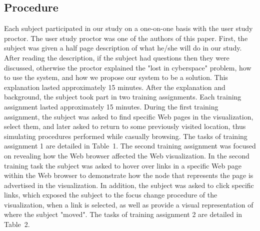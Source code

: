 \documentclass[]{article}
\begin{document}
{\begin{table}[t]
\label{table:assign2}
\end{table}

\subsection{Procedure}

Each subject participated in our study on a one-on-one basis with the user study proctor.  The user study proctor was one of the authors of this paper.
First, the subject was given a half page description of what he/she will do in our study.
After reading the description, if the subject had questions then they were discussed, otherwise the proctor explained the "lost in cyberspace" problem, how to use the system, and how we propose our system to be a solution.  This explanation lasted approximately 15 minutes.  After the explanation and background, the subject took part in two training assignments.
Each training assignment lasted approximately 15 minutes.
During the first training assignment, the subject was asked to find specific Web pages in the visualization, select them, and later asked to return to some previously visited location, thus simulating procedures performed while casually browsing.
The tasks of training assignment 1 are detailed in Table~1.
The second training assignment was focused on revealing how the Web browser affected the Web visualization.
In the second training task the subject was asked to hover over links in a specific Web page within the Web browser to demonstrate how the node that represents the page is advertised in the visualization.
In addition, the subject was asked to click specific links, which exposed the subject to the focus change procedure of the visualization, when a link is selected, as well as provide a visual representation of where the subject "moved".
The tasks of training assignment 2 are detailed in Table~2.

}
\end{document}
